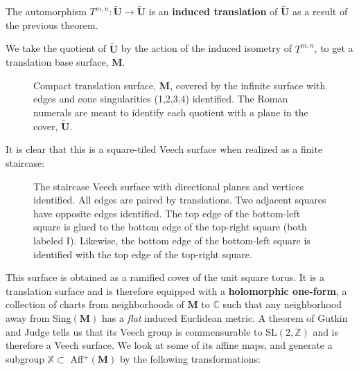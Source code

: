 \documentclass[]{article}
\begin{document}
\begin{Def}
The automorphism $T^{m,n}:\tilde{\mathbf{U}}\rightarrow\tilde{\mathbf{U}}$ is an  \textbf{induced translation} of $\tilde{\mathbf{U}}$ as a result of the previous theorem.
\end{Def}


We take the quotient of $\mathbf{\tilde{\mathbf{U}}}$ by the action of the induced isometry of $T^{m,n}$, to get a translation base surface, $\mathbf{M}$.

\begin{figure}[H]
\centering

\caption{Compact translation surface, $\mathbf{M}$, covered by the infinite surface with edges and cone singularities (1,2,3,4) identified. The Roman numerals are meant to identify each quotient with a plane in the cover, $\mathbf{\tilde{\mathbf{U}}}$.}
\label{fig:mtilda}
\end{figure}

It is clear that this is a square-tiled Veech surface when realized as a finite staircase:

\begin{figure}[H]
\centering

\caption{The staircase Veech surface with directional planes and vertices identified. All edges are paired by translations. Two adjacent squares have opposite edges identified. The top edge of the bottom-left square is glued to the bottom edge of the top-right square (both labeled I). Likewise, the bottom edge of the bottom-left square is identified with the top edge of the top-right square.}
\label{fig:staircase}
\end{figure}

This surface is obtained as a ramified cover of the unit square torus. It is a translation surface and is therefore equipped with a \textbf{holomorphic one-form}, a collection of charts from neighborhoods of $\mathbf{M}$ to $\mathbb{C}$ such that any neighborhood away from Sing$(\mathbf{M})$ has a \emph{flat} induced Euclidean metric. A theorem of Gutkin and Judge tells us that its Veech group is commensurable to SL$(2,\mathbb{Z})$ and is therefore a Veech surface. We look at some of its affine maps, and generate a subgroup $\mathbb{X}\subset$ Aff$^+(\mathbf{M})$  by the following transformations:
\end{document}
